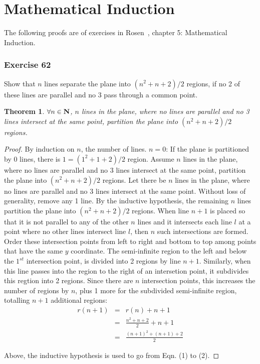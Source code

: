 \documentclass{article}
\newcommand{\basis}{\newline \noindent {\bf Basis:} }
\newcommand{\ih}{\newline \noindent {\bf Induction hypothesis:}  Assume }
\newcommand{\is}{\newline \noindent {\bf Induction:} }
\begin{document}

\section*{Mathematical Induction}
The following proofs are of exercises in Rosen~\cite{RosenText}, chapter 5: Mathematical Induction.

\subsubsection*{Exercise 62}

Show that $n$ lines separate the plane into $(n^2 + n + 2) / 2$ regions, if no 2 of these lines are parallel and no 3 pass through a common point.

\newtheorem*{thm}{Theorem}
\begin{thm}
$\forall n \in {\bf N}$, $n$ lines in the plane, where no lines are parallel and no 3 lines intersect at the same point, 
partition the plane into $(n^2 + n + 2) / 2$ regions.
\end{thm}

\begin{proof}
By induction on $n$, the number of lines.
\basis
$n = 0$: If the plane is partitioned by 0 lines, there is $1 = (1^2 + 1 + 2)/2$ region.
\ih
$n$ lines in the plane, where no lines are parallel and no 3 lines intersect at the same point, 
partition the plane into $(n^2 + n + 2) / 2$ regions.
\is
Let there be $n$ lines in the plane, where no lines are parallel and no 3 lines intersect at the same point.
Without loss of generality, remove any 1 line.
By the inductive hypothesis, the remaining $n$ lines partition the plane into $(n^2 + n + 2)/2$ regions.
When line $n + 1$ is placed so that it is not parallel to any of the other $n$ lines and it intersects each line $l$ at a point where no other lines intersect line $l$,
then $n$ such intersections are formed.
Order these intersection points from left to right and bottom to top among points that have the same $y$ coordinate.
The semi-infinite region to the left and below the $1^{st}$ intersection point, is divided into 2 regions by line $n + 1$.
Similarly, when this line passes into the region to the right of an intersetion point, it subdivides this regtion into 2 regions.
Since there are $n$ intersection points, this increases the number of regions by $n$, plus 1 more for the subdivided semi-infinite region, totalling $n + 1$ additional regions:
\begin{eqnarray}
r( n + 1) & = & r( n ) + n + 1 \\
          & = & \frac{n^2 + n + 2}{2} + n + 1 \\
          & = & \frac{(n + 1)^2 + (n + 1) + 2}{2}
\end{eqnarray}

Above, the inductive hypothesis is used to go from Eqn. (1) to (2).

\end{proof}



\end{document}
